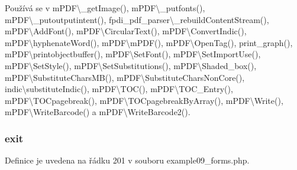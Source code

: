 Používá se v m\-P\-D\-F\textbackslash{}\-\_\-get\-Image(), m\-P\-D\-F\textbackslash{}\-\_\-putfonts(), m\-P\-D\-F\textbackslash{}\-\_\-putoutputintent(), fpdi\-\_\-pdf\-\_\-parser\textbackslash{}\-\_\-rebuild\-Content\-Stream(), m\-P\-D\-F\textbackslash{}\-Add\-Font(), m\-P\-D\-F\textbackslash{}\-Circular\-Text(), m\-P\-D\-F\textbackslash{}\-Convert\-Indic(), m\-P\-D\-F\textbackslash{}hyphenate\-Word(), m\-P\-D\-F\textbackslash{}m\-P\-D\-F(), m\-P\-D\-F\textbackslash{}\-Open\-Tag(), print\-\_\-graph(), m\-P\-D\-F\textbackslash{}printobjectbuffer(), m\-P\-D\-F\textbackslash{}\-Set\-Font(), m\-P\-D\-F\textbackslash{}\-Set\-Import\-Use(), m\-P\-D\-F\textbackslash{}\-Set\-Style(), m\-P\-D\-F\textbackslash{}\-Set\-Substitutions(), m\-P\-D\-F\textbackslash{}\-Shaded\-\_\-box(), m\-P\-D\-F\textbackslash{}\-Substitute\-Chars\-M\-B(), m\-P\-D\-F\textbackslash{}\-Substitute\-Chars\-Non\-Core(), indic\textbackslash{}substitute\-Indic(), m\-P\-D\-F\textbackslash{}\-T\-O\-C(), m\-P\-D\-F\textbackslash{}\-T\-O\-C\-\_\-\-Entry(), m\-P\-D\-F\textbackslash{}\-T\-O\-Cpagebreak(), m\-P\-D\-F\textbackslash{}\-T\-O\-Cpagebreak\-By\-Array(), m\-P\-D\-F\textbackslash{}\-Write(), m\-P\-D\-F\textbackslash{}\-Write\-Barcode() a m\-P\-D\-F\textbackslash{}\-Write\-Barcode2().

\hypertarget{example09__forms_8php_a6733eb5f605d09eaede9845835d71c4e}{
\subsubsection[{exit}]{\setlength{\rightskip}{0pt plus 5cm}exit}}\label{example09__forms_8php_a6733eb5f605d09eaede9845835d71c4e}


Definice je uvedena na řádku 201 v souboru example09\-\_\-forms.\-php.

